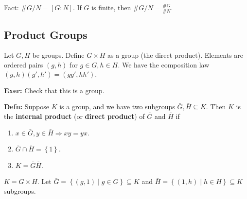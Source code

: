 \documentclass[10pt,letterpaper]{article}
\newcommand{\n}{\hfill\break}
\newcommand{\up}{\vspace{-\baselineskip}}
\newcommand{\hangblock}[2]{\par\noindent\settowidth{\hangindent}{\textbf{#1: }}\textbf{#1: }\!\!\!#2}
\newcommand{\defn}[1]{\hangblock{Defn}{#1}}
\newcommand{\exer}[1]{\hangblock{Exer}{#1}}
\newcommand{\set}[1]{\left\{#1\right\}}
\begin{document}
\par\noindent
Fact: $\#G/N=[G:N]$. If $G$ is finite, then $\#G/N=\frac{\#G}{\#N}$.\n

\subsection*{Product Groups}

\par\noindent
Let $G,H$ be groups. Define $G\times{}H$ as a group (the direct product). Elements are ordered pairs $(g,h)$ for $g\in{}G,h\in{}H$. We have the composition law $(g,h)(g',h')=(gg',hh')$.\n

\exer{
	Check that this is a group.\n
}

\defn{
	Suppose $K$ is a group, and we have two subgroups $\bar{G},\bar{H}\subseteq{}K$. Then $K$ is the \textbf{internal product} (or \textbf{direct product}) of $\bar{G}$ and $\bar{H}$ if
	\begin{enumerate}
		\item $x\in\bar{G},y\in\bar{H}\Rightarrow{}xy=yx$.
		\item $\bar{G}\cap\bar{H}=\set{1}$.
		\item $K=\bar{G}\bar{H}$.
	\end{enumerate}\up\n
}

\par\noindent
$K=G\times{}H$. Let $\bar{G}=\set{(g,1)\mid{}g\in{}G}\subseteq{}K$ and $\bar{H}=\set{(1,h)\mid{}h\in{}H}\subseteq{}K$ subgroups.
\end{document}
